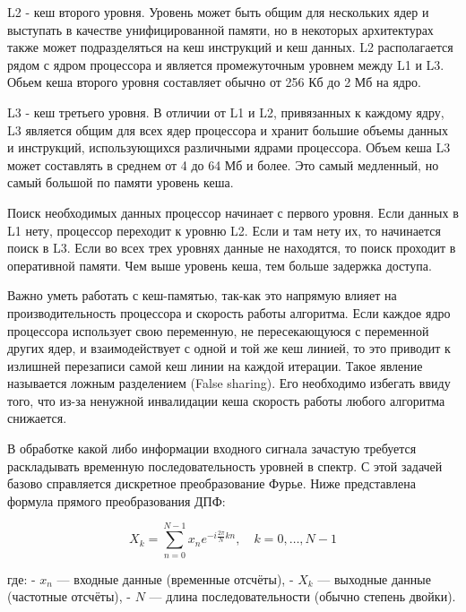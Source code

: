 \documentclass{article}
\begin{document}
L2 - кеш второго уровня.
Уровень может быть общим для нескольких ядер и выступать в качестве унифицированной памяти, но в некоторых архитектурах также может подразделяться на кеш инструкций и кеш данных.
L2 располагается рядом с ядром процессора и является промежуточным уровнем между L1 и L3. 
Обьем кеша второго уровня составляет обычно от 256 Кб до 2 Мб на ядро.

L3 - кеш третьего уровня.
В отличии от L1 и L2, привязанных к каждому ядру, L3 является общим для всех ядер процессора и хранит большие объемы данных и инструкций, использующихся различными ядрами процессора.
Объем кеша L3 может составлять в среднем от 4 до 64 Мб и более.
Это самый медленный, но самый большой по памяти уровень кеша.

Поиск необходимых данных процессор начинает с первого уровня.
Если данных в L1 нету, процессор переходит к уровню L2.
Если и там нету их, то начинается поиск в L3.
Если во всех трех уровнях данные не находятся, то поиск проходит в оперативной памяти.
Чем выше уровень кеша, тем больше задержка доступа.

Важно уметь работать с кеш-памятью, так-как это напрямую влияет на производительность процессора и скорость работы алгоритма.
Если каждое ядро процессора использует свою переменную, не пересекающуюся с переменной других ядер, и взаимодействует с одной и той же кеш линией, то это приводит к излишней перезаписи самой кеш линии на каждой итерации.
Такое явление называется ложным разделением (False sharing).
Его необходимо избегать ввиду того, что из-за ненужной инвалидации кеша скорость работы любого алгоритма снижается.

В обработке какой либо информации входного сигнала зачастую требуется раскладывать временную последовательность уровней в спектр.
С этой задачей базово справляется дискретное преобразование Фурье.
Ниже представлена формула прямого преобразования ДПФ:

\[
X_k = \sum_{n=0}^{N-1} x_n e^{-i \frac{2\pi}{N} kn}, \quad k = 0, \dots, N-1
\]

где:
- \(x_n\) — входные данные (временные отсчёты),
- \(X_k\) — выходные данные (частотные отсчёты),
- \(N\) — длина последовательности (обычно степень двойки).
\end{document}
